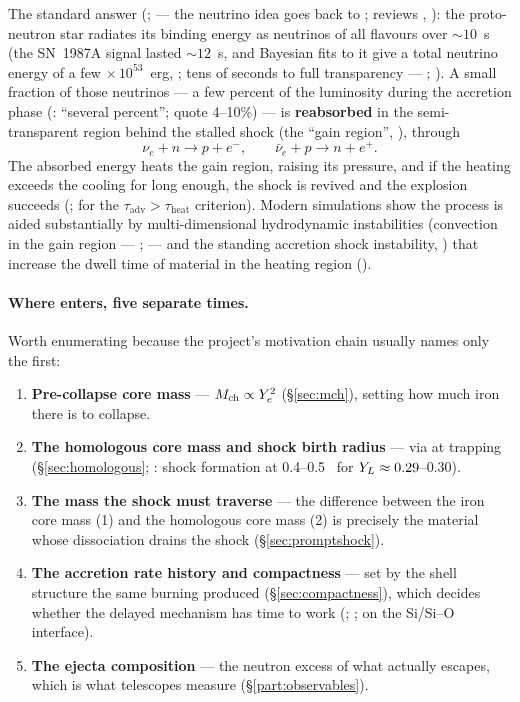 The standard answer (\citealt{wilson1985}; \citealt{bethe1985} --- the neutrino
idea goes back to \citealt{colgate1966}; reviews \citealt{janka2007},
\citealt{janka2012}): the proto-neutron star radiates its binding energy as
neutrinos of all flavours over $\sim 10$~s (the SN~1987A signal lasted
$\sim 12$~s, and Bayesian fits to it give a total neutrino energy of a few
$\times\,10^{53}$~erg, \citealt{loredo2002}; tens of seconds to full
transparency --- \citealt{janka2017}; \citealt{janka2007}). A small fraction of
those neutrinos --- a few percent of the luminosity during the accretion phase
(\citealt{janka2012}: ``several percent''; \citealt{burrows2021} quote 4--10\%)
--- is \textbf{reabsorbed} in the semi-transparent region behind the stalled
shock (the ``gain region'', \citealt{bethe1985}), through
%
\begin{equation}
\nu_e + n \to p + e^-, \qquad \bar\nu_e + p \to n + e^+ .
\label{eq:gainreactions}
\end{equation}
%
The absorbed energy heats the gain region, raising its pressure, and if the
heating exceeds the cooling for long enough, the shock is revived and the
explosion succeeds (\citealt{janka2007}; \citealt{muller2016a} for the
$\tau_{\mathrm{adv}} > \tau_{\mathrm{heat}}$ criterion). Modern simulations
show the process is aided substantially by multi-dimensional hydrodynamic
instabilities (convection in the gain region --- \citealt{herant1994};
\citealt{burrows1995} --- and the standing accretion shock instability,
\citealt{blondin2003}) that increase the dwell time of material in the heating
region (\citealt{janka2012}).

\paragraph{Where \Ye{} enters, five separate times.} Worth enumerating because
the project's motivation chain usually names only the first:

\begin{enumerate}
\item \textbf{Pre-collapse core mass} --- $M_{\mathrm{ch}} \propto Y_{e}^2$ (\S\ref{sec:mch}),
  setting how much iron there is to collapse.
\item \textbf{The homologous core mass and shock birth radius} --- via \Yl{} at
  trapping (\S\ref{sec:homologous}; \citealt{janka2012}: shock formation at
  0.4--0.5~\Msun{} for $Y_{L} \approx 0.29$--0.30).
\item \textbf{The mass the shock must traverse} --- the difference between the
  iron core mass (1) and the homologous core mass (2) is precisely the material
  whose dissociation drains the shock (\S\ref{sec:promptshock}).
\item \textbf{The accretion rate history and compactness} --- set by the shell
  structure the same burning produced (\S\ref{sec:compactness}), which decides
  whether the delayed mechanism has time to work (\citealt{burrows2021};
  \citealt{ertl2016}; \citealt{boccioli2024} on the Si/Si--O interface).
\item \textbf{The ejecta composition} --- the neutron excess of what actually
  escapes, which is what telescopes measure (\S\ref{part:observables}).
\end{enumerate}

